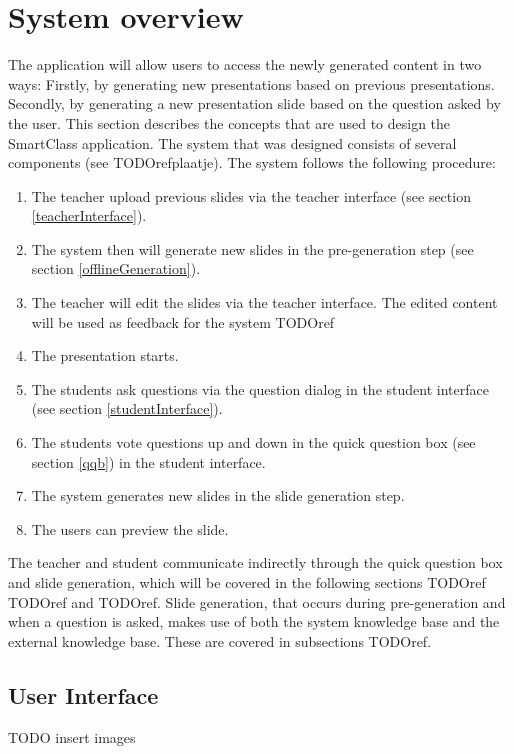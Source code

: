 \documentclass[11pt]{article}
\begin{document}
\section{System overview}
The application will allow users to access the newly generated content in two ways: Firstly, by generating new presentations based on previous presentations. Secondly, by generating a new presentation slide based on the question asked by the user. This section describes the concepts that are used to design the SmartClass application.
The system that was designed consists of several components (see TODOref{plaatje}). The system follows the following procedure:
\begin{enumerate}
\item The teacher upload previous slides via the teacher interface (see section \ref{teacherInterface}).
\item The system then will generate new slides in the pre-generation step (see section \ref{offlineGeneration}).
\item The teacher will edit the slides via the teacher interface. The edited content will be used as feedback for the system TODOref
\item The presentation starts.
\item The students ask questions via the question dialog in the student interface (see section \ref{studentInterface}).
\item The students vote questions up and down in the quick question box (see section \ref{qqb}) in the student interface.
\item The system generates new slides in the slide generation step.
\item The users can preview the slide.
\end{enumerate}
The teacher and student communicate indirectly through the quick question box and slide generation, which will be covered in the following sections TODOref TODOref and TODOref. Slide generation, that occurs during pre-generation and when a question is asked, makes use of both the system knowledge base and the external knowledge base. These are covered in subsections TODOref. 


\subsection{User Interface}
TODO insert images
\end{document}
